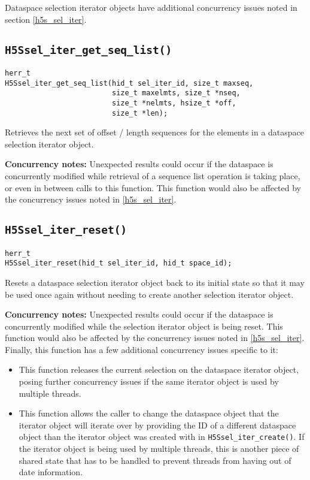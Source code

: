 \documentclass[../HDF5_RFC.tex]{subfiles}
\begin{document}
Dataspace selection iterator objects have additional concurrency issues noted in section
\ref{h5s_sel_iter}.

\subsection{\texttt{H5Ssel\_iter\_get\_seq\_list()}}
\label{apdx:h5s_func_h5ssel_iter_get_seq_list}

\begin{verbatim}
herr_t
H5Ssel_iter_get_seq_list(hid_t sel_iter_id, size_t maxseq,
                         size_t maxelmts, size_t *nseq,
                         size_t *nelmts, hsize_t *off,
                         size_t *len);
\end{verbatim}

Retrieves the next set of offset / length sequences for the elements in a dataspace selection
iterator object.

\textbf{Concurrency notes:} Unexpected results could occur if the dataspace is concurrently
modified while retrieval of a sequence list operation is taking place, or even in between
calls to this function. This function would also be affected by the concurrency issues noted
in \ref{h5s_sel_iter}.

\subsection{\texttt{H5Ssel\_iter\_reset()}}
\label{apdx:h5s_func_h5ssel_iter_reset}

\begin{verbatim}
herr_t
H5Ssel_iter_reset(hid_t sel_iter_id, hid_t space_id);
\end{verbatim}

Resets a dataspace selection iterator object back to its initial state so that it may be
used once again without needing to create another selection iterator object.

\textbf{Concurrency notes:} Unexpected results could occur if the dataspace is concurrently
modified while the selection iterator object is being reset. This function would also be
affected by the concurrency issues noted in \ref{h5s_sel_iter}. Finally, this function has a
few additional concurrency issues specific to it:

\begin{itemize}
    \item This function releases the current selection on the dataspace iterator object, posing
          further concurrency issues if the same iterator object is used by multiple threads.
    \item This function allows the caller to change the dataspace object that the iterator object
          will iterate over by providing the ID of a different dataspace object than the iterator
          object was created with in \texttt{H5Ssel\_iter\_create()}. If the iterator object is
          being used by multiple threads, this is another piece of shared state that has to be
          handled to prevent threads from having out of date information.
\end{itemize}
\end{document}
